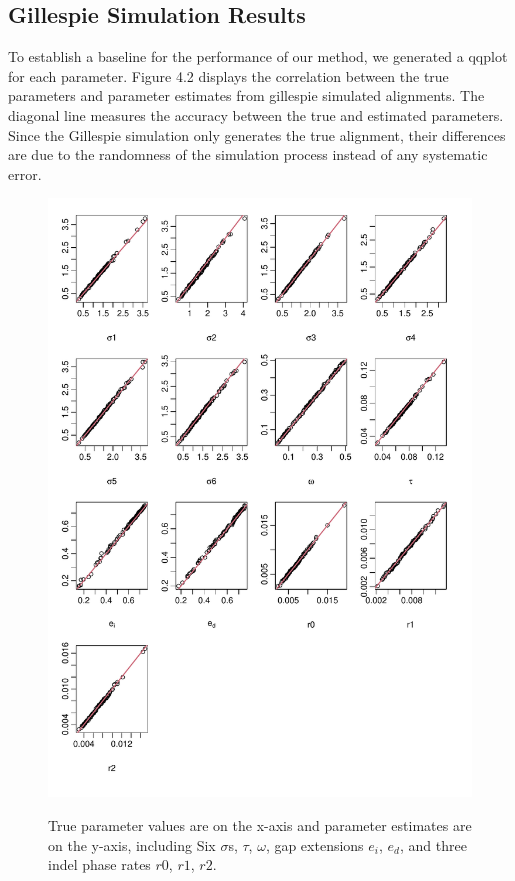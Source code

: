 \subsection{Gillespie Simulation Results}
To establish a baseline for the performance of our method, we generated a qqplot for each parameter. Figure 4.2 displays the correlation between the true parameters and parameter estimates from gillespie simulated alignments. The diagonal line measures the accuracy between the true and estimated parameters. Since the Gillespie simulation only generates the true alignment, their differences are due to the randomness of the simulation process instead of any systematic error. 
\begin{figure}[H]
     \centering
     \begin{minipage}[t]{1\textwidth}
     \includegraphics[width=1\linewidth,height=1.2\linewidth]{Fig2.pdf}
     { {True parameter values are on the x-axis and parameter estimates are on the y-axis, including Six $\sigma$s, $\tau$, $\omega$, gap extensions $e_i$, $e_d$, and three indel phase rates $r0$, $r1$, $r2$.}
 \par}
     \end{minipage}
\end{figure}
